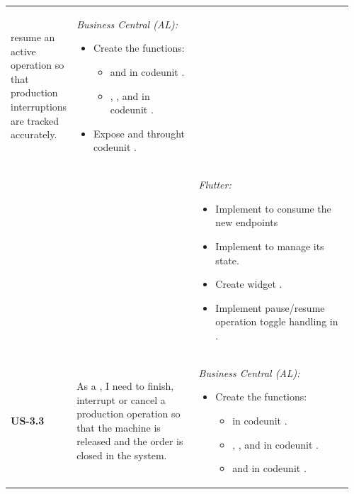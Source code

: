 \begin{longtable}{@{} P{0.09\linewidth} P{0.38\linewidth} P{0.49\linewidth} @{}}
	resume an active operation so that production interruptions are tracked
	accurately.
	& \noindent\textit{Business Central (AL):}
	\begin{itemize}[nosep, leftmargin=*]
		\item Create the functions:
		\begin{itemize}[nosep, leftmargin=*] 
			\item {} and  in codeunit .
			\item {}, , and  in codeunit . 
		\end{itemize}
		\item Expose  and  throught codeunit .
	\end{itemize}
	\\ & &
	\noindent\textit{Flutter:}
	\begin{itemize}[nosep, leftmargin=*]
		\item Implement  to consume the new endpoints 
		\item Implement  to manage its state.
		\item Create widget .
		\item Implement pause/resume operation toggle handling in .
	\end{itemize} \\	
	\midrule
	\textbf{US-3.3}
	& As a , I need to finish, interrupt or cancel a production
	operation so that the machine is released and the order is closed in the
	system.
	& \noindent\textit{Business Central (AL):}
	\begin{itemize}[nosep, leftmargin=*]
		\item Create the functions:
		\begin{itemize}[nosep, leftmargin=*]
			\item {} in codeunit .
			\item {}, ,   and  in codeunit .
			\item {} and  in codeunit .

\end{itemize}
\end{itemize}
\end{longtable}
